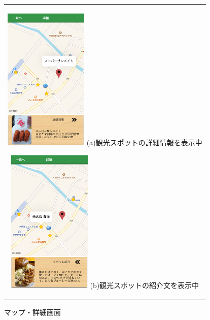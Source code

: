 \begin{figure}[htbp]
  \begin{center}
    \begin{tabular}{c}

      \begin{minipage}{0.33\hsize}
        \begin{center}
\includegraphics[width=4cm, bb=0 0 303 573]{kiko_map1.png}
          \hspace{1cm} (a)観光スポットの詳細情報を表示中
        \end{center}
      \end{minipage}

      \begin{minipage}{0.33\hsize}
        \begin{center}
\includegraphics[width=4cm, bb=0 0 304 570]{kiko_map2.png}
          \hspace{1cm} (b)観光スポットの紹介文を表示中
        \end{center}
      \end{minipage}

    \end{tabular}
    \caption{マップ・詳細画面}
    \label{fig:lena}
  \end{center}
\end{figure}
\
